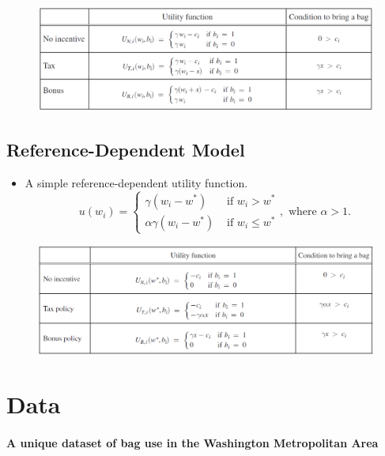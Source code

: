 \documentclass[../root]{subfiles}
\begin{document}
    \begin{figure}[ht]
      \centering
      \includegraphics[scale = .8]{0807tanji/modelA}
    \end{figure}

    \subsection{Reference-Dependent Model}

    \begin{itemize}
      \item A simple reference-dependent utility function.
      \[
      u(w_i) = \begin{cases}
        \gamma (w_i - w^*) & \text{ if } w_i > w^* \\
        \alpha \gamma (w_i - w^*) & \text{ if } w_i \leq w^*
    \end{cases},
    \text{ where }\alpha > 1.
      \]
    \end{itemize}

    \begin{figure}[ht]
      \centering
      \includegraphics[scale = .8]{0807tanji/modelB}
    \end{figure}


    \section{Data}

    \paragraph{A unique dataset of bag use in the Washington Metropolitan Area}
\end{document}
